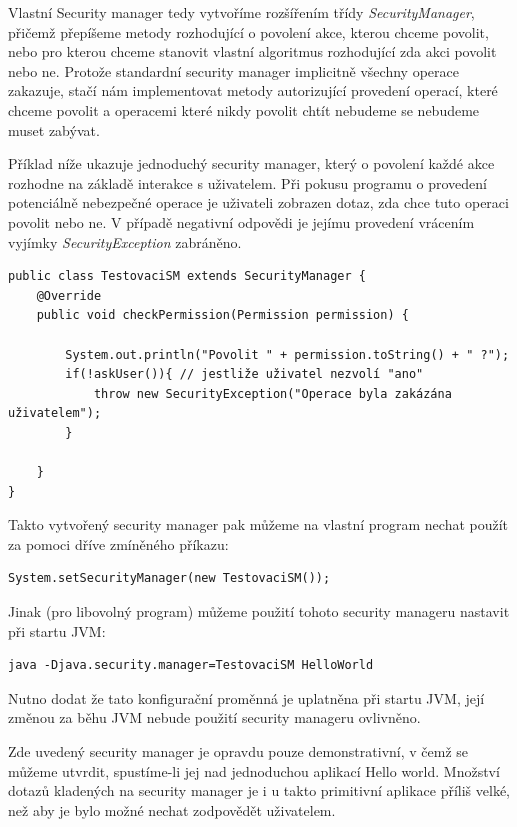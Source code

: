 Vlastní Security manager tedy vytvoříme rozšířením třídy {\it SecurityManager}, přičemž přepíšeme metody rozhodující o povolení akce, kterou chceme povolit, nebo pro kterou chceme stanovit vlastní algoritmus rozhodující zda akci povolit nebo ne.
Protože standardní security manager implicitně všechny operace zakazuje, stačí nám implementovat metody autorizující provedení operací, které chceme povolit a operacemi které nikdy povolit chtít nebudeme se nebudeme muset zabývat.

Příklad níže ukazuje jednoduchý security manager, který o povolení každé akce rozhodne na základě interakce s uživatelem. Při pokusu programu o provedení potenciálně nebezpečné operace je uživateli zobrazen dotaz, zda chce tuto operaci povolit nebo ne. V případě negativní odpovědi je jejímu provedení vrácením vyjímky {\it SecurityException} zabráněno.

\begin{verbatim}
public class TestovaciSM extends SecurityManager {
    @Override
    public void checkPermission(Permission permission) {
        
        System.out.println("Povolit " + permission.toString() + " ?");
        if(!askUser()){ // jestliže uživatel nezvolí "ano"
            throw new SecurityException("Operace byla zakázána uživatelem");
        }
        
    }
}
\end{verbatim}

Takto vytvořený security manager pak můžeme na vlastní program nechat použít za pomoci dříve zmíněného příkazu:

\begin{verbatim}
System.setSecurityManager(new TestovaciSM());
\end{verbatim}

Jinak (pro libovolný program) můžeme použití tohoto security manageru nastavit při startu JVM:

\begin{verbatim}
java -Djava.security.manager=TestovaciSM HelloWorld
\end{verbatim}

Nutno dodat že tato konfigurační proměnná je uplatněna při startu JVM, její změnou za běhu JVM nebude použití security manageru ovlivněno.

Zde uvedený security manager je opravdu pouze demonstrativní, v čemž se můžeme utvrdit, spustíme-li jej nad jednoduchou aplikací Hello world. Množství dotazů kladených na security manager je i u takto primitivní aplikace příliš velké, než aby je bylo možné nechat zodpovědět uživatelem.


